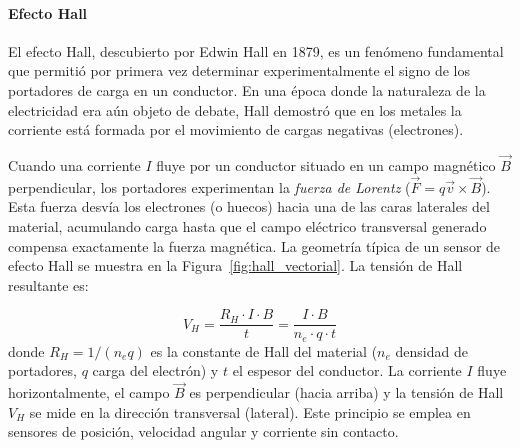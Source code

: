 \paragraph{Efecto Hall}

El efecto Hall, descubierto por Edwin Hall en 1879, es un fenómeno fundamental que permitió por primera vez determinar experimentalmente el signo de los portadores de carga en un conductor. En una época donde la naturaleza de la electricidad era aún objeto de debate, Hall demostró que en los metales la corriente está formada por el movimiento de cargas negativas (electrones).


Cuando una corriente $I$ fluye por un conductor situado en un campo magnético $\vec{B}$ perpendicular, los portadores experimentan la \emph{fuerza de Lorentz} ($\vec{F} = q\vec{v} \times \vec{B}$). Esta fuerza desvía los electrones (o huecos) hacia una de las caras laterales del material, acumulando carga hasta que el campo eléctrico transversal generado compensa exactamente la fuerza magnética. La geometría típica de un sensor de efecto Hall se muestra en la Figura~\ref{fig:hall_vectorial}. La tensión de Hall resultante es:

\begin{equation}\label{eq:v_hall}
    V_H = \frac{R_H \cdot I \cdot B}{t} = \frac{I \cdot B}{n_e \cdot q \cdot t}
\end{equation}
%
donde $R_H = 1/(n_e q)$ es la constante de Hall del material ($n_e$ densidad de portadores, $q$ carga del electrón) y $t$ el espesor del conductor. La corriente $I$ fluye horizontalmente, el campo $\vec{B}$ es perpendicular (hacia arriba) y la tensión de Hall $V_H$ se mide en la dirección transversal (lateral). Este principio se emplea en sensores de posición, velocidad angular y corriente sin contacto.


